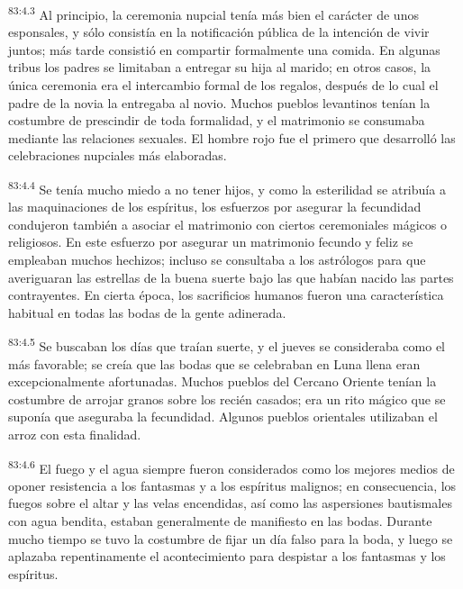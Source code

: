 \documentclass[twoside, 11pt]{book}
\begin{document}
\par
\textsuperscript{83:4.3} Al principio, la ceremonia nupcial tenía más bien el carácter de unos esponsales, y sólo consistía en la notificación pública de la intención de vivir juntos; más tarde consistió en compartir formalmente una comida. En algunas tribus los padres se limitaban a entregar su hija al marido; en otros casos, la única ceremonia era el intercambio formal de los regalos, después de lo cual el padre de la novia la entregaba al novio. Muchos pueblos levantinos tenían la costumbre de prescindir de toda formalidad, y el matrimonio se consumaba mediante las relaciones sexuales. El hombre rojo fue el primero que desarrolló las celebraciones nupciales más elaboradas.

\par
\textsuperscript{83:4.4} Se tenía mucho miedo a no tener hijos, y como la esterilidad se atribuía a las maquinaciones de los espíritus, los esfuerzos por asegurar la fecundidad condujeron también a asociar el matrimonio con ciertos ceremoniales mágicos o religiosos. En este esfuerzo por asegurar un matrimonio fecundo y feliz se empleaban muchos hechizos; incluso se consultaba a los astrólogos para que averiguaran las estrellas de la buena suerte bajo las que habían nacido las partes contrayentes. En cierta época, los sacrificios humanos fueron una característica habitual en todas las bodas de la gente adinerada.

\par
\textsuperscript{83:4.5} Se buscaban los días que traían suerte, y el jueves se consideraba como el más favorable; se creía que las bodas que se celebraban en Luna llena eran excepcionalmente afortunadas. Muchos pueblos del Cercano Oriente tenían la costumbre de arrojar granos sobre los recién casados; era un rito mágico que se suponía que aseguraba la fecundidad. Algunos pueblos orientales utilizaban el arroz con esta finalidad.

\par
\textsuperscript{83:4.6} El fuego y el agua siempre fueron considerados como los mejores medios de oponer resistencia a los fantasmas y a los espíritus malignos; en consecuencia, los fuegos sobre el altar y las velas encendidas, así como las aspersiones bautismales con agua bendita, estaban generalmente de manifiesto en las bodas. Durante mucho tiempo se tuvo la costumbre de fijar un día falso para la boda, y luego se aplazaba repentinamente el acontecimiento para despistar a los fantasmas y los espíritus.
\end{document}
